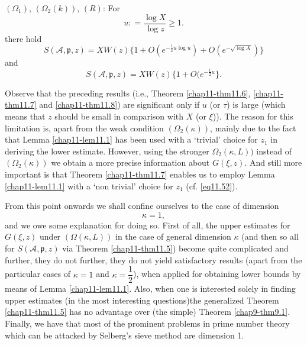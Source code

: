 \begin{theorem}\label{chap11-thm11.8}%
$(\Omega_1)$, $(\Omega_2(k))$, $(R)$:  For
\begin{equation*}
u : = \frac{\log X}{\log z} \ge 1.\tag{11.42}\label{eq11.42}
\end{equation*}
there hold
\begin{equation*}
S(\mathscr{A},\mathfrak{p},z) = X W(z) \{ 1+O(e^{ -\frac{1}{2} u \log
  u}) + O(e ^{- \sqrt{\log X}})\}\tag{11.43}\label{eq11.43} 
\end{equation*}
and 
\begin{equation*}
S(\mathscr{A},\mathfrak{p},z) = X W(z) \{ 1+O(e^{ -\frac{1}{2} u
}\}.\tag{11.44}\label{eq11.44} 
\end{equation*}
\end{theorem}

Observe that the preceding results (i.e., Theorem \ref{chap11-thm11.6},
\ref{chap11-thm11.7} and \ref{chap11-thm11.8}) are significant only if $u$
(or $\tau$) is large (which 
means that $z$ should be small in comparison with $X$ (or
$\xi$)). The reason for this limitation is, apart from the weak
condition $(\Omega_2(\kappa))$, mainly due to the fact that Lemma
\ref{chap11-lem11.1} 
has been used with a `trivial' choice for $z_{1}$ in deriving the
lower estimate. However, using the
stronger $\Omega_2(\kappa,L))$ instead of
$(\Omega_2(\kappa))$ we obtain a more precise information about $G (\xi,
z)$. And still more important is that Theorem \ref{chap11-thm11.7}
enables us to employ Lemma \ref{chap11-lem11.1} with a `non trivial'
choice for $z_1$ (cf. \eqref{eq11.52}). 

From this point onwards we shall confine ourselves to the case of
dimension  
\begin{equation*}
\kappa = 1,\tag{11.45}\label{eq11.45}
\end{equation*} 
and we owe some explanation for doing so. First of all, the upper
estimates for $G(\xi,z)$ under $(\Omega(\kappa,L))$ in the case of general
dimension $\kappa$ (and then so all for $S(\mathscr{A},\mathfrak{p},z)$ via
Theorem \ref{chap11-thm11.5}) become quite complicated and further, they do not
further, they do not yield satisfactory results (apart from the
particular cases of $\kappa = 1$ and $\kappa = \dfrac{1}{2}$), when
applied for obtaining lower bounds by means of Lemma
\ref{chap11-lem11.1}. Also, when one is 
interested solely in finding upper estimates (in the most interesting
questions)\pageoriginale the generalized Theorem \ref{chap11-thm11.5}
has no advantage over (the 
simple) Theorem \ref{chap9-thm9.1}. Finally, we have that most of the
prominent problems in prime number theory which can be attacked by Selberg's
sieve method are dimension 1. 
 
